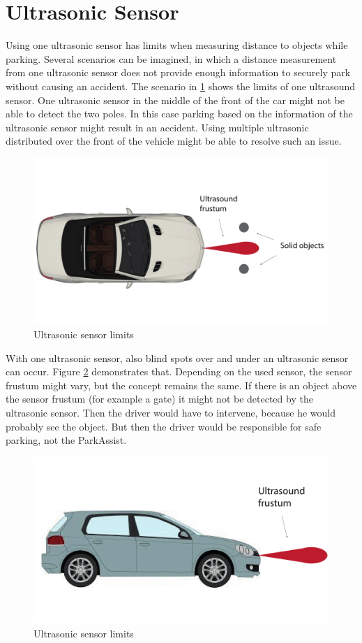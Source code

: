 \section{Ultrasonic Sensor}
Using one ultrasonic sensor has limits when measuring distance to objects while parking.
Several scenarios can be imagined, in which a distance measurement from one ultrasonic sensor does not provide enough information to securely park without causing an accident.
The scenario in \ref{fig:D13_USLimitAbove} shows the limits of one ultrasound sensor. One ultrasonic sensor in the middle of the front of the car might not be able to detect the two poles. In this case parking based on the information of the ultrasonic sensor might result in an accident.
Using multiple ultrasonic distributed over the front of the vehicle might be able to resolve such an issue.
\begin{figure}[H]
\centering
\includegraphics[width=.7\textwidth]{images/us_drawing.pdf}
\caption{Ultrasonic sensor limits}
\label{fig:D13_USLimitAbove}
\end{figure}
With one ultrasonic sensor, also blind spots over and under an ultrasonic sensor can occur.
Figure \ref{fig:D13_USLimitSide} demonstrates that.
Depending on the used sensor, the sensor frustum might vary, but the concept remains the same.
If there is an object above the sensor frustum (for example a gate) it might not be detected by the ultrasonic sensor.
Then the driver would have to intervene, because he would probably see the object.
But then the driver would be responsible for safe parking, not the ParkAssist.


\begin{figure}[H]
\centering
\includegraphics[width=.7\textwidth]{images/us_drawing2.pdf}
\caption{Ultrasonic sensor limits}
\label{fig:D13_USLimitSide}
\end{figure}

